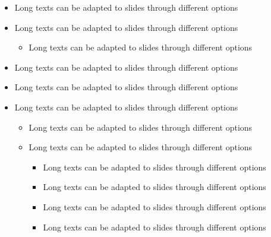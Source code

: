 \documentclass[usepdftitle=false,professionalfonts,compress ]{beamer}
\begin{document}
{\begin{frame}
\begin{itemize}
\begin{itemize}
\begin{itemize}
				\end{itemize}

			\item Long texts can be adapted to slides through different options

				\end{itemize}

			\item Long texts can be adapted to slides through different options

			\item Long texts can be adapted to slides through different options


	\begin{itemize}

	\item Long texts can be adapted to slides through different options

				\end{itemize}

			\item Long texts can be adapted to slides through different options

			\item Long texts can be adapted to slides through different options

			\item Long texts can be adapted to slides through different options


	\begin{itemize}

	\item Long texts can be adapted to slides through different options

			\item Long texts can be adapted to slides through different options


	\begin{itemize}

	\item Long texts can be adapted to slides through different options

			\item Long texts can be adapted to slides through different options

			\item Long texts can be adapted to slides through different options

			\item Long texts can be adapted to slides through different options

				\end{itemize}


\end{itemize}
\end{itemize}
\end{frame}}
\end{document}
